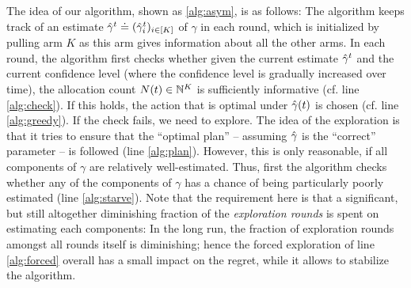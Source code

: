 The idea of our algorithm, shown as \cref{alg:asym}, is as follows:
The algorithm keeps track of an estimate $\hat{\gamma}^{t}\doteq(\hat{\gamma}^t_i)_{i \in [K]}$ of $\gamma$ in each round, which is initialized by pulling arm $K$ as this arm
gives information about all the other arms.
In each round, the algorithm first checks whether given the current estimate $\hat{\gamma}^t$ and the current confidence level (where the confidence level is gradually increased over time), the  allocation count $N(t)\in \mathbb{N}^K$
is sufficiently informative (cf. line \ref{alg:check}). If this holds, the action that is optimal under $\hat{\gamma}(t)$ is chosen 
(cf. line \ref{alg:greedy}). If the check fails, we need to explore.
The idea of the exploration is that it tries to ensure that the ``optimal plan'' -- assuming $\hat{\gamma}$ is the ``correct'' parameter -- is followed (line \ref{alg:plan}). However, this is only reasonable, if all components of $\gamma$ are relatively well-estimated.
Thus, first the algorithm checks whether any of the components of $\gamma$ has a chance of being
particularly poorly estimated (line \ref{alg:starve}). Note that the requirement here is that a significant, but still altogether diminishing fraction of the \emph{exploration rounds} is spent on estimating each components: In the long run, the fraction of exploration rounds amongst all rounds itself is diminishing; hence the forced exploration of line \ref{alg:forced} overall has a small impact on the regret, while it allows to stabilize the algorithm.

